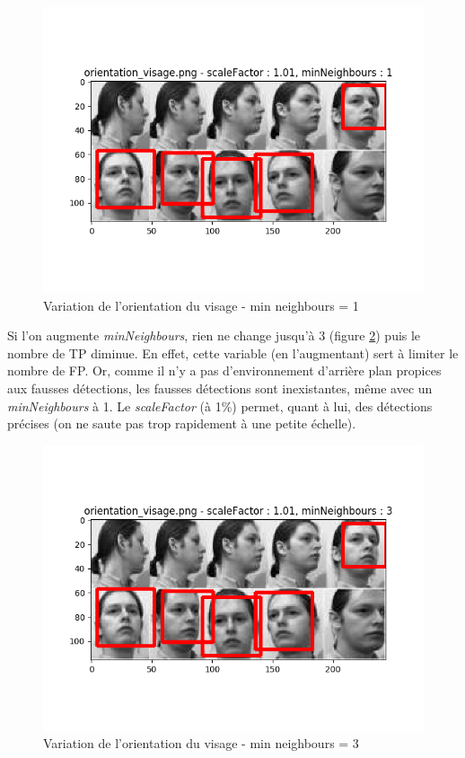 \documentclass[a4paper,11pt]{article}
\begin{document}
	\begin{figure}[H]
	    \begin{center}
		\includegraphics[scale = 0.6]{images/orientation_visage_1,01_1.png}
		\caption{Variation de l'orientation du visage - min neighbours = 1}
		\label{fig:visage_or1}
	    \end{center}
	\end{figure}

	Si l'on augmente \textit{minNeighbours}, rien ne change jusqu'à 3 (figure
	\ref{fig:visage_or2}) puis le nombre de TP diminue. En effet, cette variable
	(en l'augmentant) sert à limiter le nombre de FP. Or, comme il n'y a pas
	d'environnement d'arrière plan propices aux fausses détections, les fausses détections sont
	inexistantes, même avec un \textit{minNeighbours} à 1. Le \textit{scaleFactor} (à 1\%)
	permet,	quant à	lui, des détections précises (on ne saute pas trop rapidement à une petite 
	échelle).

	\begin{figure}[H]
	    \begin{center}
		\includegraphics[scale = 0.6]{images/orientation_visage_1,01_3.png}
		\caption{Variation de l'orientation du visage - min neighbours = 3}
		\label{fig:visage_or2}
	    \end{center}
	\end{figure}
\end{document}
